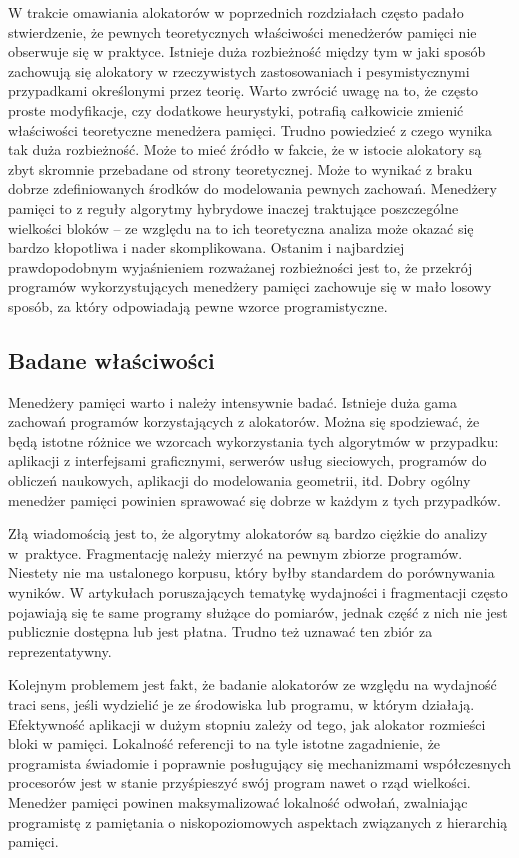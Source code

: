\documentclass[12pt,a4paper,titlepage,twoside]{mwart}
\begin{document}
W trakcie omawiania alokatorów w poprzednich rozdziałach często padało
stwierdzenie, że pewnych teoretycznych właściwości menedżerów pamięci nie
obserwuje się w praktyce. Istnieje duża rozbieżność między tym w jaki sposób
zachowują się alokatory w rzeczywistych zastosowaniach i pesymistycznymi
przypadkami określonymi przez teorię. Warto zwrócić uwagę na to, że często
proste modyfikacje, czy dodatkowe heurystyki, potrafią całkowicie zmienić
właściwości teoretyczne menedżera pamięci. Trudno powiedzieć z czego wynika tak
duża rozbieżność. Może to mieć źródło w fakcie, że w istocie alokatory są zbyt
skromnie przebadane od strony teoretycznej. Może to wynikać z braku dobrze
zdefiniowanych środków do modelowania pewnych zachowań.  Menedżery pamięci to z
reguły algorytmy hybrydowe inaczej traktujące poszczególne wielkości bloków --
ze względu na to ich teoretyczna analiza może okazać się bardzo kłopotliwa i
nader skomplikowana. Ostanim i najbardziej prawdopodobnym wyjaśnieniem rozważanej
rozbieżności jest to, że przekrój programów wykorzystujących menedżery pamięci
zachowuje się w mało losowy sposób, za który odpowiadają pewne wzorce
programistyczne.

\subsection{Badane właściwości}

Menedżery pamięci warto i należy intensywnie badać. Istnieje duża gama zachowań
programów korzystających z alokatorów. Można się spodziewać, że będą istotne
różnice we wzorcach wykorzystania tych algorytmów w przypadku: aplikacji z
interfejsami graficznymi, serwerów usług sieciowych, programów do obliczeń
naukowych, aplikacji do modelowania geometrii, itd. Dobry ogólny menedżer
pamięci powinien sprawować się dobrze w każdym z tych przypadków.

Złą wiadomością jest to, że algorytmy alokatorów są bardzo ciężkie do analizy
w~praktyce. Fragmentację należy mierzyć na pewnym zbiorze programów. Niestety
nie ma ustalonego korpusu, który byłby standardem do porównywania wyników.  W
artykułach poruszających tematykę wydajności i fragmentacji często pojawiają
się te same programy służące do pomiarów, jednak część z nich nie jest
publicznie dostępna lub jest płatna. Trudno też uznawać ten zbiór za
reprezentatywny.

Kolejnym problemem jest fakt, że badanie alokatorów ze względu na wydajność
traci sens, jeśli wydzielić je ze środowiska lub programu, w którym działają.
Efektywność aplikacji w dużym stopniu zależy od tego, jak alokator rozmieści
bloki w pamięci. Lokalność referencji to na tyle istotne zagadnienie, że
programista świadomie i poprawnie posługujący się mechanizmami współczesnych
procesorów jest w stanie przyśpieszyć swój program nawet o rząd wielkości.
Menedżer pamięci powinen maksymalizować lokalność odwołań, zwalniając
programistę z pamiętania o niskopoziomowych aspektach związanych z hierarchią
pamięci.
\end{document}
